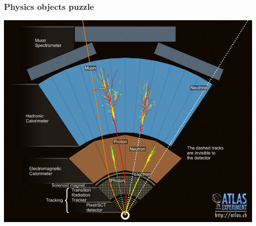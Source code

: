 
\begin{frame}\frametitle{Physics objects puzzle}
\centering\myskip

\includegraphics[height=0.85\textheight, width=1.\textwidth]{../detector/figures/detection}

\end{frame}



